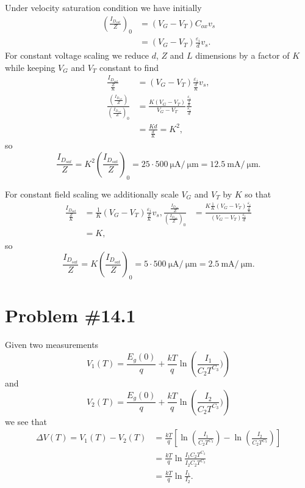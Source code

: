 \documentclass{article}
\begin{document}
Under velocity saturation condition we have initially
\begin{align*}
\left(\frac{I_{D_{sat}}}{Z}\right)_0 &= (V_G - V_T)C_{ox} v_s \\
                                     &= (V_G - V_T)\frac{\varepsilon_i}{d} v_s.
\end{align*}
For constant voltage scaling we reduce $d$, $Z$ and $L$ dimensions by 
a factor of $K$ while keeping $V_G$ and $V_T$ constant to find
\begin{align*}
\frac{I_{D_{sat}}}{\frac{Z}{K}} &= (V_G - V_T)\frac{\varepsilon_i}{\frac{d}{K}} v_s, \\
\frac{\left(\frac{I_{D_{sat}}}{Z}\right)}
     {\left(\frac{I_{D_{sat}}}{Z}\right)_0} 
 &= \frac{K(V_G - V_T)}{V_G - V_T} \frac{\frac{\varepsilon_i}{\frac{d}{K}}}
                                     {\frac{\varepsilon_i}{d}} \\
 &= \frac{Kd}{\frac{d}{K}} = K^2,
\end{align*}
so
$$
\frac{I_{D_{sat}}}{Z} = K^2\left(\frac{I_{D_{sat}}}{Z}\right)_0 
                      = 25 \cdot 500 ~\mathrm{\mu A} / ~\mathrm{\mu m} 
                      = 12.5 ~\mathrm{m A} / ~\mathrm{\mu m}.
$$

For constant field scaling we additionally scale $V_G$ and $V_T$ by $K$
so that
\begin{align*}
\frac{I_{D_{sat}}}{\frac{Z}{K}} &= \frac{1}{K}(V_G - V_T)\frac{\varepsilon_i}{\frac{d}{K}} v_s,
\frac{\frac{I_{D_{sat}}}{Z}}{\left(\frac{I_{D_{sat}}}{Z}\right)_0}
  &= \frac{K\frac{1}{K}(V_G - V_T) \frac{\varepsilon_i}{\frac{d}{K}}}
          {(V_G - V_T) \frac{\varepsilon_i}{d}} \\
  &= K,
\end{align*}
so
$$
\frac{I_{D_{sat}}}{Z} = K\left(\frac{I_{D_{sat}}}{Z}\right)_0 
                      = 5 \cdot 500 ~\mathrm{\mu A} / ~\mathrm{\mu m}
                      = 2.5 ~\mathrm{mA} / ~\mathrm{\mu m}.
$$

\pagebreak

\section*{Problem \#14.1}
Given two measurements
$$
V_1(T) = \frac{E_g(0)}{q} + \frac{kT}{q} \ln \left(\frac{I_1}{C_2 T^{C_3}})\right)
$$
and
$$
V_2(T) = \frac{E_g(0)}{q} + \frac{kT}{q} \ln \left(\frac{I_2}{C_2 T^{C_3}})\right)
$$
we see that
\begin{align*}
\Delta V(T) = V_1(T) - V_2(T) &=
  \frac{kT}{q}\left[\ln \left(\frac{I_1}{C_2 T^{C_3}}\right)
                  - \ln \left(\frac{I_2}{C_2 T^{C_3}}\right)\right] \\
  &= \frac{kT}{q} \ln \frac{I_1 C_2 T^{C_3}}{I_2 C_2 T^{C_3}} \\
  &= \frac{kT}{q} \ln \frac{I_1}{I_2}.
\end{align*}
\end{document}
